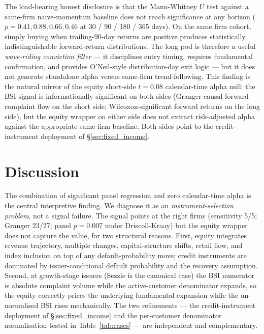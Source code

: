 \documentclass[11pt,a4paper]{article}
\begin{document}
The load-bearing honest disclosure is that the Mann-Whitney $U$ test against a same-firm naive-momentum baseline does not reach significance at any horizon ($p = 0.41, 0.88, 0.66, 0.46$ at 30 / 90 / 180 / 365 days). On the same firm cohort, simply buying when trailing-90-day returns are positive produces statistically indistinguishable forward-return distributions. The long pod is therefore a useful \emph{wave-riding conviction filter} --- it disciplines entry timing, requires fundamental confirmation, and provides O'Neil-style distribution-day exit logic --- but it does not generate standalone alpha versus same-firm trend-following. This finding is the natural mirror of the equity short-side $t = 0.08$ calendar-time alpha null: the BSI signal is informationally significant on both sides (Granger-causal forward complaint flow on the short side; Wilcoxon-significant forward returns on the long side), but the equity wrapper on either side does not extract risk-adjusted alpha against the appropriate same-firm baseline. Both sides point to the credit-instrument deployment of §\ref{sec:fixed_income}.

\section{Discussion}\label{sec:discussion}

The combination of significant panel regression and zero calendar-time alpha is the central interpretive finding. We diagnose it as an \emph{instrument-selection problem}, not a signal failure. The signal points at the right firms (sensitivity 5/5; Granger 23/27; panel $p = 0.007$ under Driscoll-Kraay) but the equity wrapper does not capture the value, for two structural reasons. First, equity integrates revenue trajectory, multiple changes, capital-structure shifts, retail flow, and index inclusion on top of any default-probability move; credit instruments are dominated by issuer-conditional default probability and the recovery assumption. Second, at growth-stage issuers (Sezzle is the canonical case) the BSI numerator is absolute complaint volume while the active-customer denominator expands, so the equity correctly prices the underlying fundamental expansion while the un-normalised BSI rises mechanically. The two refinements --- the credit-instrument deployment of §\ref{sec:fixed_income} and the per-customer denominator normalisation tested in Table~\ref{tab:cases} --- are independent and complementary.
\end{document}
